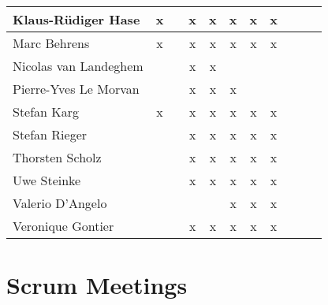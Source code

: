 \documentclass[a4paper, 11pt]{article}
\begin{document}
\begin{tabular}{|l|c|c|c|c||c|c|c||c|c|c|}
Klaus-R\"udiger Hase & x &   & x & x & x & x & x \\\hline
Marc Behrens         & x  &   & x & x & x & x & x \\\hline
Nicolas van Landeghem &   &   & x & x &   &   &   \\\hline
Pierre-Yves Le Morvan &   &   & x & x & x &   &   \\\hline
Stefan Karg          & x &   & x & x & x & x & x \\\hline
Stefan Rieger        &   &   & x & x & x & x & x \\\hline
Thorsten Scholz      &   &   & x & x & x & x & x \\\hline
Uwe Steinke          &   &   & x & x & x & x & x \\\hline
Valerio D'Angelo     &   &   &   &   & x & x & x \\\hline
Veronique Gontier    &   &   & x & x & x & x & x \\\hline
\end{tabular}


\section{Scrum Meetings}
\end{document}
